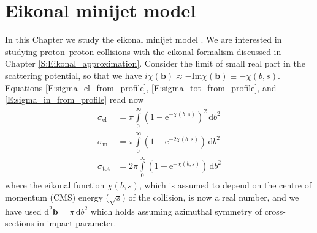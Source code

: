 \documentclass[a4paper, twoside, english, 12pt]{report}
\begin{document}
\cleardoublepage
\chapter{Eikonal minijet model}\label{S:malli}


In this Chapter we study the eikonal minijet model \cite{xnw, durand}. We are interested in studying proton--proton collisions with the eikonal formalism discussed in Chapter \ref{S:Eikonal_approximation}. Consider the limit of small real part in the scattering potential, so that we have $i\chi(\mathbf{b})\approx -\text{Im}\chi(\mathbf{b}) \equiv -\chi(b,s)$. Equations \eqref{E:sigma_el_from_profile}, \eqref{E:sigma_tot_from_profile}, and \eqref{E:sigma_in_from_profile} read now
\begin{align}
	\sigma_{\text{el}} &= \pi\int\limits_0^\infty \left(1-\text{e}^{-\chi(b,s)} \right)^2 \, \text{d}b^2 \label{E:sigma_el} \\[0.8em]
	\sigma_\text{in} &= \pi\int\limits_0^\infty \left(1-\text{e}^{-2\chi(b,s)} \right) \, \text{d}b^2 \label{E:sigma_in} \\[0.8em]
	\sigma_\text{tot} &= 2\pi\int\limits_0^\infty \left(1-\text{e}^{-\chi(b,s)} \right) \, \text{d}b^2 \label{E:sigma_tot}
\end{align}
where the eikonal function $\chi(b,s)$, which is assumed to depend on the centre of momentum (CMS) energy ($\sqrt{s}$) of the collision, is now a real number, and we have used $\text{d}^2\mathbf{b} = \pi\,\text{d}b^2$ which holds assuming azimuthal symmetry of cross-sections in impact parameter.
\end{document}
